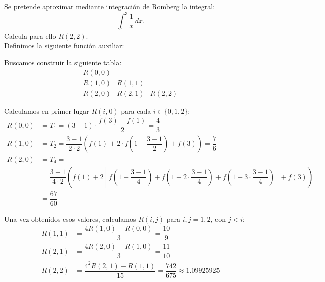 \begin{ejercicio}
    Se pretende aproximar mediante integración de Romberg la integral:
    \begin{equation*}
        \int_1^3 \frac{1}{x} \, dx.
    \end{equation*}
    Calcula para ello \( R(2, 2) \).\\

    Definimos la siguiente función auxiliar:

    Buscamos construir la siguiente tabla:
    \begin{equation*}
        \begin{array}{ccc}
            R(0, 0) \\
            R(1, 0) & R(1, 1) \\
            R(2, 0) & R(2, 1) & R(2, 2)
        \end{array}
    \end{equation*}

    Calculamos en primer lugar \( R(i, 0) \) para cada $i\in \{0,1,2\}$:
    \begin{align*}
        R(0, 0) &= T_1 = (3-1)\cdot \dfrac{f(3)-f(1)}{2}
        = \dfrac{4}{3}\\
        R(1, 0) &= T_2 = \dfrac{3-1}{2\cdot 2}\left(f(1)+2\cdot f\left(1+\dfrac{3-1}{2}\right)+f(3)\right)
        = \dfrac{7}{6}\\
        R(2, 0) &= T_{4} =\\&= \dfrac{3-1}{4\cdot 2}\left(f(1)+2\left[f\left(1+\dfrac{3-1}{4}\right)+f\left(1+2\cdot \dfrac{3-1}{4}\right)+f\left(1+3\cdot \dfrac{3-1}{4}\right)\right]+f(3)\right)
        =\\&= \dfrac{67}{60}
    \end{align*}

    Una vez obtenidos esos valores, calculamos \( R(i, j) \) para \( i,j=1,2 \), con $ j < i $:
    \begin{align*}
        R(1, 1) &= \dfrac{4R(1,0)-R(0,0)}{3} = \dfrac{10}{9}\\
        R(2, 1) &= \dfrac{4R(2,0)-R(1,0)}{3} = \dfrac{11}{10}\\
        R(2, 2) &= \dfrac{4^2R(2,1)-R(1,1)}{15} = \dfrac{742}{675}\approx 1.09925925
    \end{align*}
\end{ejercicio}

